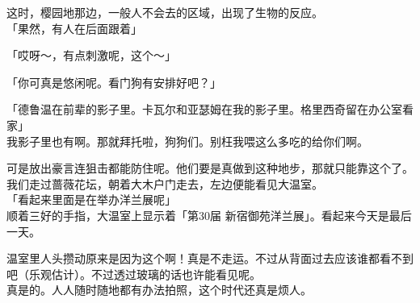 这时，樱园地那边，一般人不会去的区域，出现了生物的反应。\\

「果然，有人在后面跟着」

「哎呀～，有点刺激呢，这个～」

「你可真是悠闲呢。看门狗有安排好吧？」

「德鲁温在前辈的影子里。卡瓦尔和亚瑟姆在我的影子里。格里西奇留在办公室看家」\\

我影子里也有啊。那就拜托啦，狗狗们。别枉我喂这么多吃的给你们啊。

可是放出豪言连狙击都能防住呢。他们要是真做到这种地步，那就只能靠这个了。\\

我们走过蔷薇花坛，朝着大木户门走去，左边便能看见大温室。\\

「看起来里面是在举办洋兰展呢」\\

顺着三好的手指，大温室上显示着「第30届 新宿御苑洋兰展」。看起来今天是最后一天。

温室里人头攒动原来是因为这个啊！真是不走运。不过从背面过去应该谁都看不到吧（乐观估计）。不过透过玻璃的话也许能看见呢。\\

真是的。人人随时随地都有办法拍照，这个时代还真是烦人。\\

